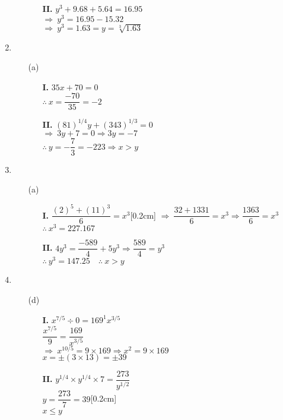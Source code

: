 \begin{multicols}{2}
\begin{enumerate}
\begin{itemize}
\begin{itemize}
\item[{\bf II.}] $y^3 + 9.68 + 5.64 = 16.95$\\
  $\Rightarrow~ y^3 = 16.95 - 15.32$\\
  $\Rightarrow~ y^3 = 1.63 = y = \sqrt[3]{1.63}$
\end{itemize}
  \end{itemize}
\item
  \begin{itemize}
  \item[(a)]
    \begin{itemize}
    \item[{\bf I.}] $35x + 70 = 0$\\[0.2cm]
      $\therefore~ x = \dfrac{-70}{35} = -2$

    \item[{\bf II.}] $(81)^{1/4}y + (343)^{1/3} = 0$\\
      $\Rightarrow~ 3y + 7 = 0 \Rightarrow 3y = -7$\\
      $\therefore~ y = -\dfrac{7}{3} = -223 \Rightarrow x > y$
     \end{itemize}
  \end{itemize}
\item
  \begin{itemize}
  \item[(a)]
    \begin{itemize}
    \item[{\bf I.}] $\dfrac{(2)^5 + (11)^{3}}{6} = x^3$[0.2cm]
      $\Rightarrow~ \dfrac{32 + 1331}{6} = x^3 \Rightarrow \dfrac{1363}{6} = x^3$\\
      $\therefore~ x^3 = 227.167$

    \item[{\bf II.}] $4y^3 = \dfrac{-589}{4} + 5y^3 \Rightarrow \dfrac{589}{4} = y^3$\\[0.2cm]
      $\therefore~ y^3 = 147.25 \quad\therefore~ x > y$
      \end{itemize}
  \end{itemize}
\item
  \begin{itemize}
  \item[(d)]
    \begin{itemize}
    \item[{\bf I.}] $x^{7/5} \div 0 = 169^1 x^{3/5}$\\[0.2cm]
      $\dfrac{x^{7/5}}{9} = \dfrac{169}{x^{3/5}}$\\[0.2cm]
      $\Rightarrow~ x^{10/5} = 9 \times 169 \Rightarrow x^2 = 9 \times 169$\\
      $x = \pm (3 \times 13) = \pm 39$

    \item[{\bf II.}] $y^{1/4} \times y^{1/4} \times 7 = \dfrac{273}{y^{1/2}}$\\[0.2cm]
      $y = \dfrac{273}{7} = 39$[0.2cm]\\
      $x \leq y$
      \end{itemize}
    \end{itemize}
\end{enumerate}
\end{multicols}

